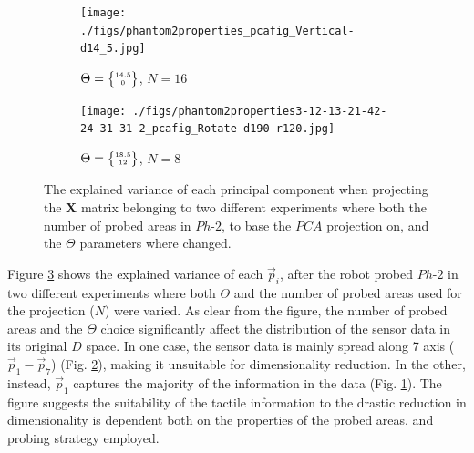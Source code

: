 \documentclass[]{interact}
\theoremstyle{plain}%
\theoremstyle{definition}
\theoremstyle{remark}
\begin{document}
\begin{figure}[]
	\centering
	\begin{subfigure}[b]{.47\textwidth}
		\texttt{[image: ./figs/phantom2properties\_pcafig\_Vertical-d14\_5.jpg]}
		\caption{$\Theta = \tiny{\begin{Bmatrix}14.5\\ 0\end{Bmatrix}}$, $N=16$}
		\label{hist:1}
	\end{subfigure}
	\hspace{0.01\textwidth}
	\begin{subfigure}[b]{.47\textwidth}
		\texttt{[image: ./figs/phantom2properties3-12-13-21-42-24-31-31-2\_pcafig\_Rotate-d190-r120.jpg]}
		\caption{$\Theta = \tiny{\begin{Bmatrix}18.5\\ 12\end{Bmatrix}}$, $N=8$}
		\label{hist:2}
	\end{subfigure}
	\caption[]{The explained variance of each principal component when projecting the $\mathbf{X}$ 
		matrix belonging to two different experiments where both the number of probed areas in $Ph\text{-}2$, to base the $PCA$ projection on, and the $\Theta$ parameters where changed.}
	\label{hist}
\end{figure}

Figure \ref{hist} shows the explained variance of each $\vec{p}_i$, after the robot probed $Ph\text{-}2$
in two different experiments where both $\Theta$ and the number of probed areas used for the projection 
($N$) were varied. As clear from the figure, the number of probed areas and the $\Theta$ choice significantly affect the 
distribution of the sensor data in its original $D$ space. In one case, the sensor data is mainly spread along 7 axis 
($\vec{p}_1-\vec{p}_7$) (Fig. \ref{hist:2}), making it unsuitable for dimensionality reduction. In the other, 
instead, $\vec{p}_1$ captures the majority of the information in the data (Fig. \ref{hist:1}). The figure suggests 
the suitability of the tactile information to the drastic reduction in dimensionality is dependent both on the 
properties of the probed areas, and probing strategy employed. %
\end{document}
